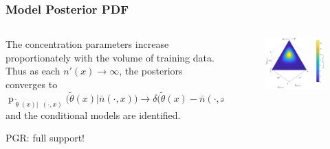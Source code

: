 \documentclass{beamer}
\DeclareMathOperator{\nbarrm}{\bar{\mathrm{n}}}
\DeclareMathOperator{\prm}{\mathrm{p}}
\begin{document}
\begin{frame}
\frametitle{Model Posterior PDF}

\begin{columns}[T]

\begin{column}{.5\linewidth}

The concentration parameters increase proportionately with the volume of training data. Thus as each $n'(x) \to \infty$, the posteriors converges to $\prm_{\tilde{\uptheta}(x) | \nbarrm(\cdot,x)}\big(\tilde{\theta}(x) | \bar{n}(\cdot,x) \big) \to \delta\big( \tilde{\theta}(x) - \bar{n}(\cdot,x) / \sum_y \bar{n}(y,x) \big)$ and the conditional models are identified.

PGR: full support!

\end{column}

\begin{column}{.5\linewidth}

\begin{figure}
\centering
\includegraphics[width=1\linewidth]{P_theta_post_uni_tilde.pdf}
\label{fig:P_theta_post_uni}
\end{figure}

\end{column}

\end{columns}

\end{frame}
\end{document}
